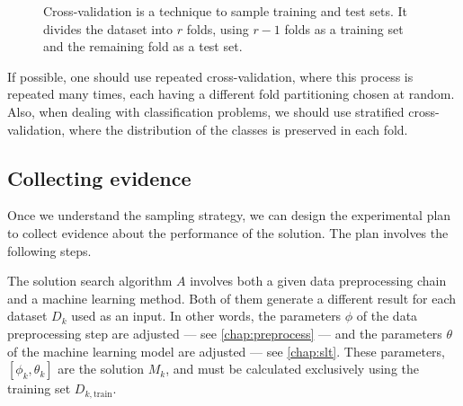 \begin{figure}
  \centering
  \caption{
  Cross-validation is a technique to sample training and test sets.  It divides the
  dataset into $r$ folds, using $r-1$ folds as a training set and the remaining fold as a
  test set.
  }
  \label{fig:cross-validation}
\end{figure}

If possible, one should use repeated cross-validation, where this process is repeated many
times, each having a different fold partitioning chosen at random.  Also, when dealing with
classification problems, we should use stratified cross-validation, where the distribution
of the classes is preserved in each fold.


\subsection{Collecting evidence}

Once we understand the sampling strategy, we can design the experimental plan to collect
evidence about the performance of the solution.  The plan involves the following steps.

The solution search algorithm $A$ involves both a
given data preprocessing chain and a machine learning method.  Both of them generate a
different result for each dataset $D_k$ used as an input.  In other words, the parameters
$\phi$ of the data preprocessing step are adjusted --- see \cref{chap:preprocess} --- and the
parameters $\theta$ of the machine learning model are adjusted --- see \cref{chap:slt}.
These parameters, $\left[\phi_k, \theta_k\right]$ are the solution $M_k$, and must be
calculated exclusively using the training set $D_{k,\text{train}}$.

